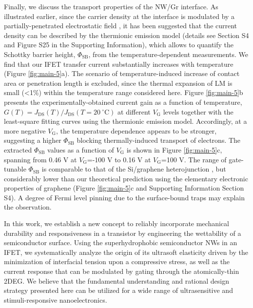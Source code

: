 Finally, we discuss the transport properties of the NW/Gr
interface. As illustrated earlier, since the carrier density at the
interface is modulated by a partially-penetrated electrostatic field
\cite{Tian_2016,Shih2015Partially}, it has been suggested that the
current density can be described by the thermionic emission model
\cite{Sze2006Mosfets} (details see Section S4 and Figure S25 in the
Supporting Information), which allows to quantify the Schottky
barrier height, \(\Phi_{\mathrm{SB}}\), from the temperature-dependent
measurements. We find that our IFET transfer current substantially
increases with temperature (Figure \ref{fig:main-5}a). The scenario of
temperature-induced increase of contact area or penetration length
is excluded, since the thermal expansion of LM is small (\textless{}1\%)
within the temperature range considered here. Figure \ref{fig:main-5}b
presents the experimentally-obtained current gain as a function of
temperature, \(G(T)=J_{\mathrm{DS}}(T)/J_{\mathrm{DS}}(T=20\ ^{\circ}
  \mathrm{C})\) at different \(V_{\mathrm{G}}\) levels together with the
least-square fitting curves using the thermionic emission
model. Accordingly, at a more negative \(V_{\mathrm{G}}\), the
temperature dependence appears to be stronger, suggesting a higher
\(\Phi_{\mathrm{SB}}\) blocking thermally-induced transport of
electrons. The extracted \(\Phi_{\mathrm{SB}}\) values as a function
of \(V_{\mathrm{G}}\) is shown in Figure \ref{fig:main-5}c, spanning
from 0.46 V at \(V_{\mathrm{G}}\)=-100 V to 0.16 V at
\(V_{\mathrm{G}}\)=100 V.  The range of gate-tunable
\(\Phi_{\mathrm{SB}}\) is comparable to that of the Si/graphene
heterojunction \cite{Yang2012Barristor}, but considerably lower than
our theoretical prediction using the elementary electronic
properties of graphene (Figure \ref{fig:main-5}c and Supporting Information Section S4). A degree of Fermi level pinning due to the
surface-bound traps \cite{Meric_2008} may explain the observation.



In this work, we establish a new concept to reliably incorporate
mechanical durability and responsiveness in a transistor by
engineering the wettability of a semiconductor surface. Using the
superhydrophobic semiconductor NWs in an IFET, we systematically
analyze the origin of its ultrasoft elasticity driven by the
minimization of interfacial tension upon a compressive stress, as well
as the current response that can be modulated by gating through the
atomically-thin 2DEG. We believe that the fundamental understanding
and rational design strategy presented here can be utilized for a wide
range of ultrasensitive and stimuli-responsive nanoelectronics.




